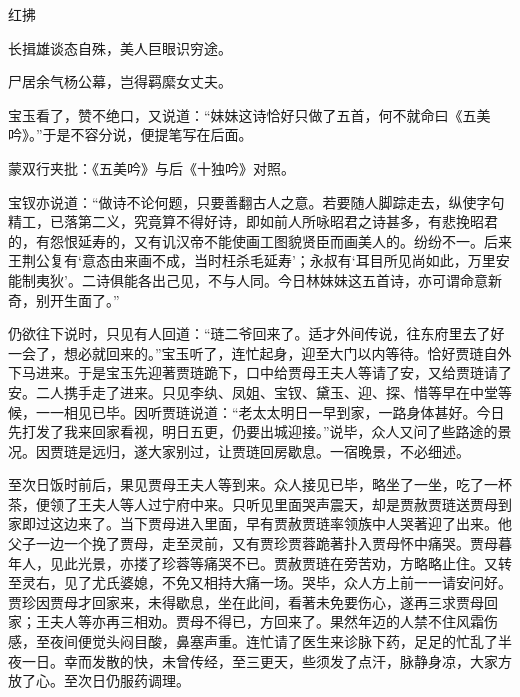 \begin{poem}
    \begin{pl}


        红拂
    \end{pl}


    \begin{pl}

        长揖雄谈态自殊，美人巨眼识穷途。
    \end{pl}


    \begin{pl}

        尸居余气杨公幕，岂得羁縻女丈夫。
    \end{pl}


\end{poem}


\begin{parag}
    宝玉看了，赞不绝口，又说道：“妹妹这诗恰好只做了五首，何不就命曰《五美吟》。”于是不容分说，便提笔写在后面。\begin{note}蒙双行夹批：《五美吟》与后《十独吟》对照。\end{note}宝钗亦说道：“做诗不论何题，只要善翻古人之意。若要随人脚踪走去，纵使字句精工，已落第二义，究竟算不得好诗，即如前人所咏昭君之诗甚多，有悲挽昭君的，有怨恨延寿的，又有讥汉帝不能使画工图貌贤臣而画美人的。纷纷不一。后来王荆公复有‘意态由来画不成，当时枉杀毛延寿’；永叔有‘耳目所见尚如此，万里安能制夷狄’。二诗俱能各出己见，不与人同。今日林妹妹这五首诗，亦可谓命意新奇，别开生面了。”
\end{parag}


\begin{parag}
    仍欲往下说时，只见有人回道：“琏二爷回来了。适才外间传说，往东府里去了好一会了，想必就回来的。”宝玉听了，连忙起身，迎至大门以内等待。恰好贾琏自外下马进来。于是宝玉先迎著贾琏跪下，口中给贾母王夫人等请了安，又给贾琏请了安。二人携手走了进来。只见李纨、凤姐、宝钗、黛玉、迎、探、惜等早在中堂等候，一一相见已毕。因听贾琏说道：“老太太明日一早到家，一路身体甚好。今日先打发了我来回家看视，明日五更，仍要出城迎接。”说毕，众人又问了些路途的景况。因贾琏是远归，遂大家别过，让贾琏回房歇息。一宿晚景，不必细述。
\end{parag}


\begin{parag}
    至次日饭时前后，果见贾母王夫人等到来。众人接见已毕，略坐了一坐，吃了一杯茶，便领了王夫人等人过宁府中来。只听见里面哭声震天，却是贾赦贾琏送贾母到家即过这边来了。当下贾母进入里面，早有贾赦贾琏率领族中人哭著迎了出来。他父子一边一个挽了贾母，走至灵前，又有贾珍贾蓉跪著扑入贾母怀中痛哭。贾母暮年人，见此光景，亦搂了珍蓉等痛哭不已。贾赦贾琏在旁苦劝，方略略止住。又转至灵右，见了尤氏婆媳，不免又相持大痛一场。哭毕，众人方上前一一请安问好。贾珍因贾母才回家来，未得歇息，坐在此间，看著未免要伤心，遂再三求贾母回家；王夫人等亦再三相劝。贾母不得已，方回来了。果然年迈的人禁不住风霜伤感，至夜间便觉头闷目酸，鼻塞声重。连忙请了医生来诊脉下药，足足的忙乱了半夜一日。幸而发散的快，未曾传经，至三更天，些须发了点汗，脉静身凉，大家方放了心。至次日仍服药调理。
\end{parag}


